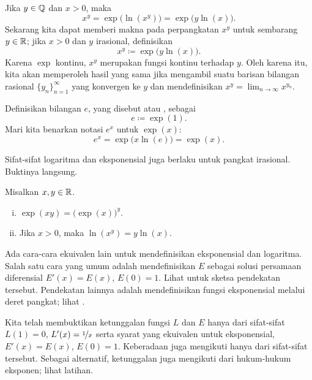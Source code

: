 Jika $y \in {\mathbb{Q}}$ dan $x > 0$, maka
\begin{equation*}
x^y = \exp\bigl(\ln(x^y)\bigr) = \exp\bigl(y\ln(x)\bigr) .
\end{equation*}
Sekarang kita dapat memberi makna pada perpangkatan $x^y$ untuk sembarang $y \in {\mathbb{R}}$;
jika $x > 0$ dan $y$ irasional, definisikan
\begin{equation*}
x^y \coloneqq \exp\bigl(y\ln(x)\bigr) .
\end{equation*}
Karena $\exp$ kontinu, $x^y$ merupakan fungsi kontinu terhadap $y$.
Oleh karena itu, kita akan
memperoleh hasil yang sama jika mengambil suatu barisan bilangan rasional
$\{ y_n \}_{n=1}^\infty$
yang konvergen ke $y$ dan mendefinisikan $x^y = \lim_{n\to\infty} x^{y_n}$.

Definisikan bilangan $e$,
yang disebut \emph{} atau
\emph{}, sebagai
\begin{equation*}
e \coloneqq \exp(1) .
\end{equation*}
Mari kita benarkan notasi $e^x$ untuk $\exp(x)$:
\begin{equation*}
e^x = \exp\bigl(x \ln(e) \bigr) = \exp(x) .
\end{equation*}

Sifat-sifat logaritma dan eksponensial juga berlaku untuk
pangkat irasional.  Buktinya langsung.

\begin{prop}
Misalkan $x, y \in {\mathbb{R}}$.
\begin{enumerate}[(i)]
\item
$\exp(xy) = {\bigl(\exp(x)\bigr)}^y$.
\item
Jika $x > 0$, maka $\ln(x^y) = y \ln (x)$.
\end{enumerate}
\end{prop}

\begin{remark}
Ada cara-cara ekuivalen lain untuk mendefinisikan eksponensial dan logaritma.
Salah satu cara yang umum adalah mendefinisikan $E$ sebagai solusi persamaan diferensial
$E'(x) = E(x)$, $E(0) = 1$.  Lihat 
untuk sketsa pendekatan tersebut.  Pendekatan lainnya
adalah mendefinisikan fungsi eksponensial melalui
deret pangkat; lihat .
\end{remark}

\begin{remark}
Kita telah membuktikan ketunggalan fungsi $L$ dan $E$ hanya dari
sifat-sifat $L(1)=0$, $L'(x) = \nicefrac{1}{x}$
serta syarat yang ekuivalen untuk eksponensial,
$E'(x) = E(x)$, $E(0) = 1$.  Keberadaan juga mengikuti
hanya dari sifat-sifat tersebut.
Sebagai alternatif, ketunggalan juga mengikuti
dari hukum-hukum eksponen; lihat latihan.
\end{remark}

